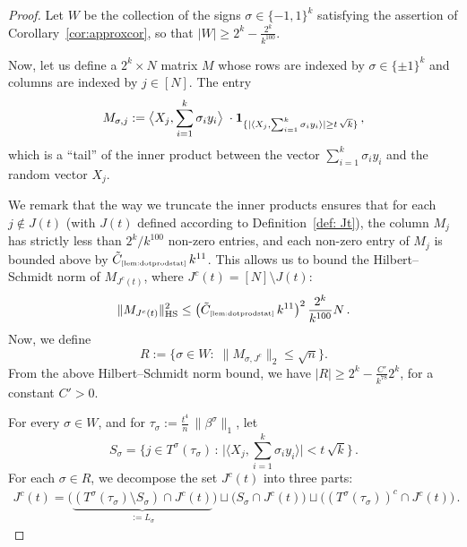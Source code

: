 \documentclass[11pt]{amsart}
\theoremstyle{definition}
\theoremstyle{plain}
\begin{document}
\begin{proof}
Let $W$ be the collection of the signs $\sigma\in\{-1,1\}^k$
satisfying the assertion of Corollary~\ref{cor:approxcor},
so that $|W|\geq 2^k-\frac{2^k}{k^{100}}$.

\medskip

Now, let us define a $2^k \times N$ matrix $M$ whose rows are indexed by $\sigma \in \{\pm1\}^{k}$ and columns are indexed by $j \in [N]$. The entry 
$$
    M_{\sigma,j} := \big\langle X_j,\sum_{i=1}^k \sigma_i y_i\big\rangle\;
    \cdot {\bf 1}_{\{ |\langle X_j,\sum_{i=1}^k \sigma_i y_i\rangle| \ge  t\,\sqrt{k}\}}\,,
$$
which is a ``tail'' of the inner product between the vector $\sum_{i=1}^k \sigma_i y_i$ and the random vector $X_j$.

We remark that the way we truncate the inner products ensures that for each $j \notin J(t)$ (with $J(t)$ defined according to
Definition~\ref{def: Jt}), the column $M_j$ has strictly less than $2^k/k^{100}$ non-zero entries, and each non-zero entry of $M_j$ is bounded above
by $\tilde C_{\text{\tiny\ref{lem:dotprodstat}}}\,k^{11}$. This allows us to bound the Hilbert--Schmidt norm of $M_{J^c(t)}$, where
$J^c(t) = [N] \setminus J(t)$:
$$\|M_{J^c(t)}\|_{\rm HS}^2 \le 
\big(\tilde C_{\text{\tiny\ref{lem:dotprodstat}}}\,k^{11}\big)^2\,
\frac{2^k}{k^{100}}N \,.$$
Now, we define 
$$
    R := \Big\{ \sigma \in W :\; \|M_{\sigma,J^c}\|_2 \le \sqrt{n}\Big\}.
$$
From the above Hilbert--Schmidt norm bound, we have $|R| \ge 2^k - \frac{C'}{k^{78}}2^k$, for a constant $C'>0$.

\bigskip

For every $\sigma\in W$, and for $\tau_\sigma:=\frac{t^4}{n}\,\|\beta^\sigma\|_1$,
let 
$$
S_\sigma = 
\Big\{ j \in T^\sigma(\tau_\sigma)\,:\, \big|\big\langle X_j,\sum_{i=1}^k \sigma_i y_i\big\rangle\big|
<  t\,\sqrt{k} \Big\}\,. 
$$
For each $\sigma \in R$, we decompose the set $J^c(t)$ into three parts: 
\begin{align*}
    J^c(t)  %
    =  \big(\underbrace{(T^\sigma(\tau_\sigma) \setminus S_\sigma) \cap J^c(t)}_{:=L_\sigma}\big) \sqcup \big(S_\sigma \cap J^c(t)\big) \sqcup \big((T^\sigma(\tau_\sigma))^c \cap J^c(t)\big) \,.
\end{align*}


\end{proof}
\end{document}
